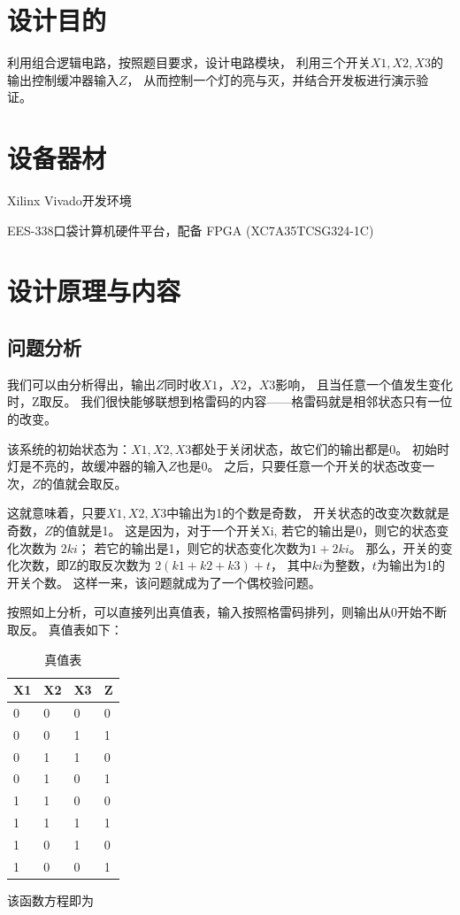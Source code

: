 \documentclass[UTF8]{article}
\begin{document}
\section{设计目的}

利用组合逻辑电路，按照题目要求，设计电路模块，
利用三个开关$X1,X2,X3$的输出控制缓冲器输入$Z$，
从而控制一个灯的亮与灭，并结合开发板进行演示验证。

\section{设备器材}
Xilinx Vivado开发环境

EES-338口袋计算机硬件平台，配备 FPGA (XC7A35TCSG324-1C)

\section{设计原理与内容}
\subsection{问题分析}

我们可以由分析得出，输出$Z$同时收$X1，X2，X3$影响，
且当任意一个值发生变化时，Z取反。
我们很快能够联想到格雷码的内容——格雷码就是相邻状态只有一位的改变。

该系统的初始状态为：$X1, X2, X3$都处于关闭状态，故它们的输出都是0。
初始时灯是不亮的，故缓冲器的输入$Z$也是0。
之后，只要任意一个开关的状态改变一次，$Z$的值就会取反。

这就意味着，只要$X1, X2, X3$中输出为1的个数是奇数，
开关状态的改变次数就是奇数，$Z$的值就是1。
这是因为，对于一个开关Xi, 若它的输出是0，则它的状态变化次数为 $2ki$；
若它的输出是1，则它的状态变化次数为$1 + 2ki$。
那么，开关的变化次数，即Z的取反次数为 $2 (k1 + k2 + k3 ) + t$，
其中$ki$为整数，$t$为输出为1的开关个数。
这样一来，该问题就成为了一个偶校验问题。


按照如上分析，可以直接列出真值表，输入按照格雷码排列，则输出从0开始不断取反。
真值表如下：

\begin{table}[!htbp]
\centering
\begin{tabu} to 0.8\textwidth{ X[c] | X[c] | X[c] | X[c] }
    \hline
    X1 & X2 & X3 & Z \\
    \hline{} & 0 & 0 & 0\\
    0 & 0 & 1 & 1\\
    0 & 1 & 1 & 0\\
    0 & 1 & 0 & 1\\
    1 & 1 & 0 & 0\\
    1 & 1 & 1 & 1\\
    1 & 0 & 1 & 0\\
    1 & 0 & 0 & 1\\

    \end{tabu}
\caption{真值表}
\end{table}
该函数方程即为  
\end{document}
